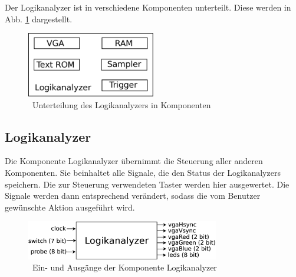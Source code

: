 \documentclass[IN,ngerman,utf8,12pt]{tumbook}
\begin{document}
Der Logikanalyzer ist in verschiedene Komponenten unterteilt.
Diese werden in Abb. \ref{abb:komp} dargestellt.

\begin{figure}
    \centerline{
        \includegraphics[width=0.5\textwidth]{img/komponenten}
    }
    \label{abb:komp}
    \caption{\ Unterteilung des Logikanalyzers in Komponenten}
\end{figure}

\subsection{Logikanalyzer}
Die Komponente Logikanalyzer übernimmt die Steuerung aller anderen Komponenten.
Sie beinhaltet alle Signale, die den Status der Logikanalyzers speichern.
Die zur Steuerung verwendeten Taster werden hier ausgewertet.
Die Signale werden dann entsprechend verändert, sodass die vom Benutzer gewünschte Aktion ausgeführt wird.

\begin{figure}[H]
    \centerline{
        \includegraphics[width=0.75\textwidth]{img/logikanalyzer}
    }
    \label{abb:logikanalyzer}
    \caption{\ Ein- und Ausgänge der Komponente Logikanalyzer}
\end{figure}
\end{document}

